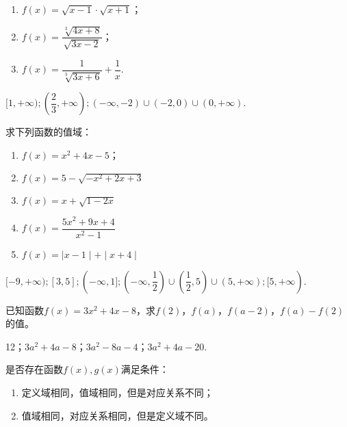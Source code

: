 \documentclass[lang=cn,newtx,10pt,scheme=chinese]{elegantbook}
\begin{document}
\begin{spacing}{1.8}
  \begin{enumerate}
    \item $f(x)=\sqrt{x-1}\cdot\sqrt{x+1}$；
    \item $f(x)=\dfrac{\sqrt[3]{4x+8}}{\sqrt{3x-2}}$；
    \item $f(x)=\dfrac1{\sqrt[3]{3x+6}}+\dfrac1x$.
  \end{enumerate}


  \begin{solution}
    $[1,+\infty);(\dfrac23,+\infty);(-\infty,-2)\cup(-2,0)\cup(0,+\infty)$.
  \end{solution}

  \begin{exercise}
    求下列函数的值域：
  \end{exercise}

  \begin{enumerate}
    \item $f(x)=x^2+4x-5$；
    \item $f(x)=5-\sqrt{-x^{2}+2x+3}$
    \item $f(x)=x+\sqrt{1-2x}$
    \item $f(x)=\dfrac{5x^{2}+9x+4}{x^{2}-1}$
    \item $f(x)=\mid x-1\mid+\mid x+4\mid $
  \end{enumerate}
\end{spacing}

\begin{solution}
  $[-9,+\infty);[3,5];(-\infty,1];(-\infty,\dfrac12)\cup(\dfrac12,5)\cup(5,+\infty);[5,+\infty)$.
\end{solution}

\begin{exercise}
  已知函数$f(x)=3x^2+4x-8$，求$f(2)$，$f(a)$，$f(a-2)$，$f(a)-f(2)$的值。
\end{exercise}

\begin{solution}
  12；$3a^2+4a-8$；$3a^2-8a-4$；$3a^2+4a-20$.
\end{solution}

\begin{exercise}\label{2017RJA.P74.17}
  是否存在函数$f(x),g(x)$满足条件：
\end{exercise}

\begin{enumerate}
  \item 定义域相同，值域相同，但是对应关系不同；
  \item 值域相同，对应关系相同，但是定义域不同。
\end{enumerate}
\end{document}
